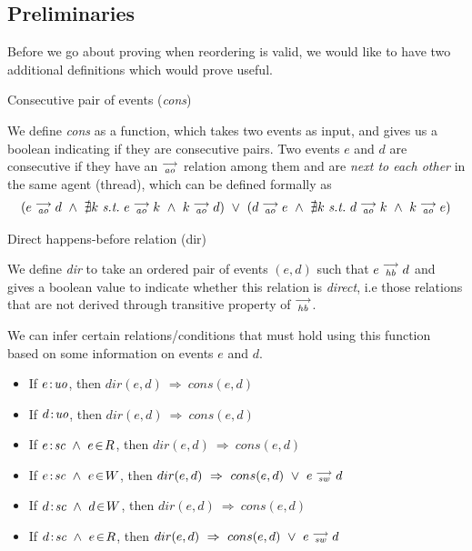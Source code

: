     \subsection{Preliminaries}
    Before we go about proving when reordering is valid, we would like to have two additional definitions which would prove useful.
    
    \begin{definition}{Consecutive pair of events (\emph{cons})}
        
        We define \emph{cons} as a function, which takes two events as input, and gives us a boolean indicating if they are consecutive pairs. Two events $e$ and $d$ are consecutive if they have an $\stackrel{\longrightarrow}{_\textit{ao}}$ relation among them and are \emph{next to each other} in the same agent (thread), which can be defined formally as 
            \begin{align*}
                (
                e \stck{_\textit{ao}} d  \ \wedge \ 
                \nexists k \ \textit{s.t.} \ 
                e \stck{_\textit{ao}} k  \ \wedge \
                k \stck{_\textit{ao}} d 
                )
                \ \vee \
                (
                    d \stck{_\textit{ao}} e  \ \wedge \ 
                    \nexists k \ \textit{s.t.} \ 
                    d \stck{_\textit{ao}} k  \ \wedge \
                    k \stck{_\textit{ao}} e  
                )
            \end{align*}
    \end{definition}

    \begin{definition}{Direct happens-before relation (dir)}
        
        We define \emph{dir} to take an ordered pair of events $(e,d)$ such that $e\stackrel{\longrightarrow}{_{\textit{hb}}}d$ and gives a boolean value to indicate whether this relation is \textit{direct}, i.e those relations that are not derived through transitive property of $\stackrel{\longrightarrow}{_\textit{hb}}$.

        
        We can infer certain relations/conditions that must hold using this function based on some information on events $e$ and $d$. 
        \begin{itemize}
            \item If $e\!:\!\textit{uo}$, then $dir(e,d) \ \Rightarrow \ cons(e,d)$
            \item If $d\!:\!\textit{uo}$, then $dir(e,d) \ \Rightarrow \ cons(e,d)$
            \item If $\et{e}{sc}\ \wedge\ e\!\in\!R$, then $dir(e,d) \ \Rightarrow \ cons(e,d)$
            \item If $\et{e}{sc}\ \wedge\ e\!\in\!W$, then $dir(e,d) \ \Rightarrow \ cons(e,d)\ \vee\ \reln{e}{sw}{d}$
            \item If $\et{d}{sc}\ \wedge\ d\!\in\!W$, then $dir(e,d) \ \Rightarrow \ cons(e,d)$
            \item If $\et{d}{sc}\ \wedge\ e\!\in\!R$, then $dir(e,d) \ \Rightarrow \ cons(e,d)\ \vee\ \reln{e}{sw}{d}$
        \end{itemize}
    \end{definition}
